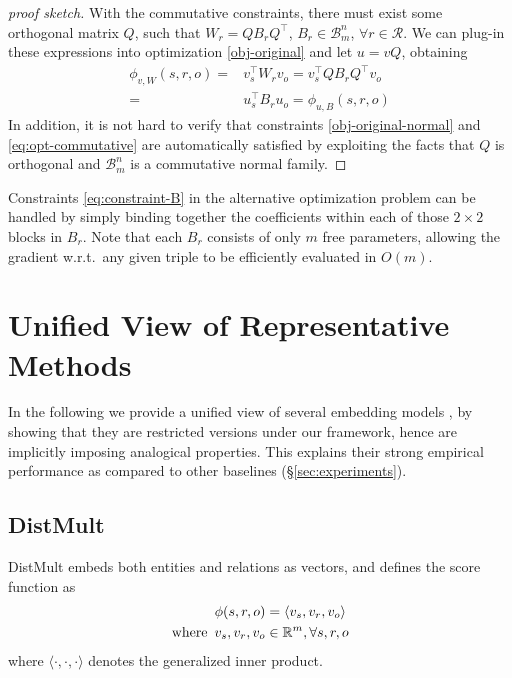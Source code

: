 \documentclass{article}
\begin{document}
\begin{proof}[proof sketch]
    With the commutative constraints,
    there must exist some orthogonal matrix $Q$,
    such that
    $ W_r = QB_rQ^\top $, $B_r \in \mathcal{B}^n_m$, $\forall r \in \mathcal{R}$.
    We can plug-in these expressions into optimization \eqref{obj-original}
    and let $u = vQ$,
    obtaining
\begin{align}
    \phi_{v, W}(s, r, o) =& v_s^\top W_r v_o
    =v_s^\top Q B_r Q^\top v_o \\
    =&u_s^\top B_r u_o = \phi_{u, B}(s, r, o)
\end{align}
In addition, it is not hard to verify that constraints \eqref{obj-original-normal} and \eqref{eq:opt-commutative}
are automatically satisfied by exploiting the facts that $Q$ is orthogonal and $\mathcal{B}_m^n$ is a commutative normal family.
\end{proof}

Constraints \eqref{eq:constraint-B} in the alternative optimization problem
can be handled by simply binding together the coefficients within each of those $2\times2$ blocks in $B_r$.
Note that each $B_r$ consists of only $m$ free parameters,
allowing the gradient w.r.t.\ any given triple to be efficiently evaluated in $O(m)$.


 \section{Unified View of Representative Methods}
\label{sec:unifiedview}
In the following we provide a unified view of several embedding models
\cite{DBLP:journals/corr/YangYHGD14a, DBLP:conf/icml/TrouillonWRGB16, DBLP:conf/aaai/NickelRP16},
by showing that they are restricted versions under our framework,
hence are implicitly imposing analogical properties.
This explains their strong empirical performance as compared to other baselines (\S \ref{sec:experiments}).

\subsection{DistMult}
DistMult \cite{DBLP:journals/corr/YangYHGD14a} embeds both entities and relations as
vectors, and defines the score function as
\begin{align}
    \phi(s, r, o) &= \langle v_s, v_r, v_o \rangle \\
    \text{where} \enskip v_s, v_r, v_o &\in \mathbb{R}^m, \forall s, r, o
    \label{eq:score-distmult}
\end{align}
where $\langle \cdot, \cdot, \cdot \rangle$ denotes the generalized inner product.
\end{document}

